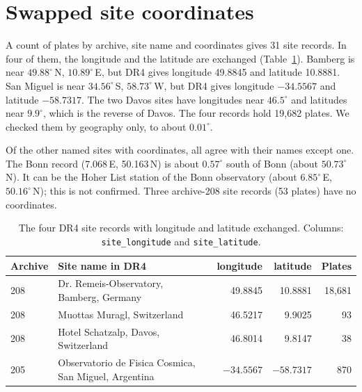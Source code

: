 \documentclass[11pt]{article}
\begin{document}
\section{Swapped site coordinates}\label{sec:swap}
A count of plates by archive, site name and coordinates gives 31 site records. In four of them, the longitude and the latitude are exchanged (Table~\ref{tab:swap}). Bamberg is near $49.88^\circ$\,N, $10.89^\circ$\,E, but DR4 gives longitude 49.8845 and latitude 10.8881. San Miguel is near $34.56^\circ$\,S, $58.73^\circ$\,W, but DR4 gives longitude $-34.5567$ and latitude $-58.7317$. The two Davos sites have longitudes near $46.5^\circ$ and latitudes near $9.9^\circ$, which is the reverse of Davos. The four records hold 19{,}682 plates. We checked them by geography only, to about $0.01^\circ$.

Of the other named sites with coordinates, all agree with their names except one. The Bonn record (7.068\,E, 50.163\,N) is about $0.57^\circ$ south of Bonn (about $50.73^\circ$\,N). It can be the Hoher List station of the Bonn observatory (about $6.85^\circ$\,E, $50.16^\circ$\,N); this is not confirmed. Three archive-208 site records (53 plates) have no coordinates.

\begin{table}[t]
\centering\small
\begin{tabular}{llrrr}\toprule
Archive & Site name in DR4 & longitude & latitude & Plates\\\midrule
208 & Dr. Remeis-Observatory, Bamberg, Germany & 49.8845 & 10.8881 & 18{,}681\\
208 & Muottas Muragl, Switzerland & 46.5217 & 9.9025 & 93\\
208 & Hotel Schatzalp, Davos, Switzerland & 46.8014 & 9.8147 & 38\\
205 & Observatorio de Fisica Cosmica, San Miguel, Argentina & $-34.5567$ & $-58.7317$ & 870\\
\bottomrule\end{tabular}
\caption{The four DR4 site records with longitude and latitude exchanged. Columns: \texttt{site\_longitude} and \texttt{site\_latitude}.}
\label{tab:swap}
\end{table}
\end{document}
